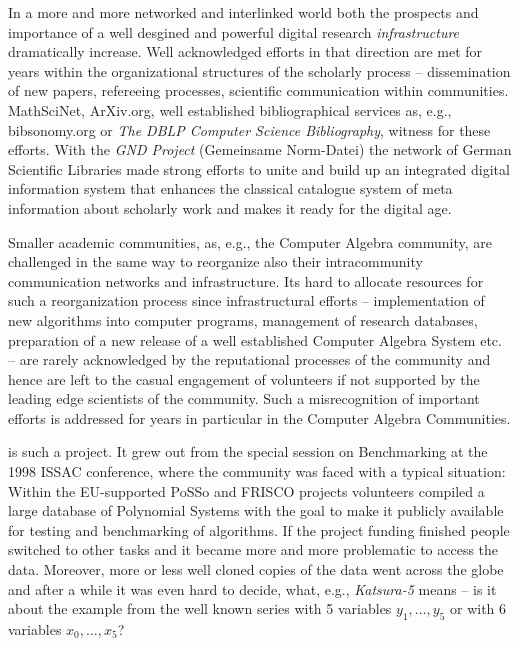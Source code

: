 \documentclass[a4paper,11pt]{article}
\begin{document}
\begin{multicols}{2}
\noindent



In a more and more networked and interlinked world both the prospects and
importance of a well desgined and powerful digital research
\emph{infrastructure} dramatically increase. Well acknowledged efforts in that
direction are met for years within the organizational structures of the
scholarly process -- dissemination of new papers, refereeing processes,
scientific communication within communities. MathSciNet, ArXiv.org, well
established bibliographical services as, e.g., bibsonomy.org or \emph{The DBLP
  Computer Science Bibliography}, witness for these efforts.  With the
\emph{GND Project} (Gemeinsame Norm-Datei) the network of German Scientific
Libraries made strong efforts to unite and build up an integrated digital
information system that enhances the classical catalogue system of meta
information about scholarly work and makes it ready for the digital age.

Smaller academic communities, as, e.g., the Computer Algebra community, are
challenged in the same way to reorganize also their intracommunity
communication networks and infrastructure.  Its hard to allocate resources for
such a reorganization process since infrastructural efforts -- implementation
of new algorithms into computer programs, management of research databases,
preparation of a new release of a well established Computer Algebra System
etc. -- are rarely acknowledged by the reputational processes of the community
and hence are left to the casual engagement of volunteers if not supported by
the leading edge scientists of the community.  Such a misrecognition of
important efforts is addressed for years in particular in the Computer Algebra
Communities.


{\SD} is such a project. It grew out from the special session on Benchmarking
at the 1998 ISSAC conference, where the community was faced with a typical
situation: Within the EU-supported PoSSo and FRISCO projects volunteers
compiled a large database of Polynomial Systems with the goal to make it
publicly available for testing and benchmarking of algorithms.  If the project
funding finished people switched to other tasks and it became more and more
problematic to access the data. Moreover, more or less well cloned copies of
the data went across the globe and after a while it was even hard to decide,
what, e.g., \emph{Katsura-5} means -- is it about the example from the well
known series with 5 variables $y_1,\dots,y_5$ or with 6 variables
$x_0,\dots,x_5$?


\end{multicols}
\end{document}
